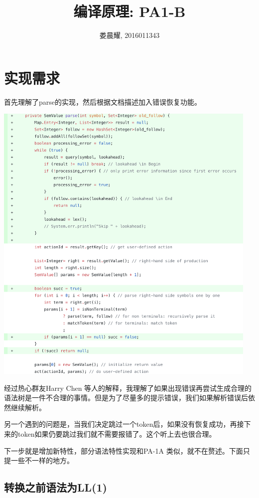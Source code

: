 \documentclass{article}
\title{编译原理: PA1-B}
\author{娄晨耀, 2016011343}
\date{}
\theoremstyle{plain}
\theoremstyle{definition}
\begin{document}
    \maketitle
    
    \section{实现需求}

    首先理解了parse的实现，然后根据文档描述加入错误恢复功能。

    \includegraphics[width=5in]{parse.png}

    经过热心群友Harry Chen 等人的解释，我理解了如果出现错误再尝试生成合理的语法树是一件不合理的事情。但是为了尽量多的提示错误，我们如果解析错误后依然继续解析。

    另一个遇到的问题是，当我们决定跳过一个token后，如果没有恢复成功，再接下来的token如果仍要跳过我们就不需要报错了。这个听上去也很合理。

    下一步就是增加新特性，部分语法特性实现和PA-1A 类似，就不在赘述。下面只提一些不一样的地方。

    \subsection{转换之前语法为LL(1)}
\end{document}
